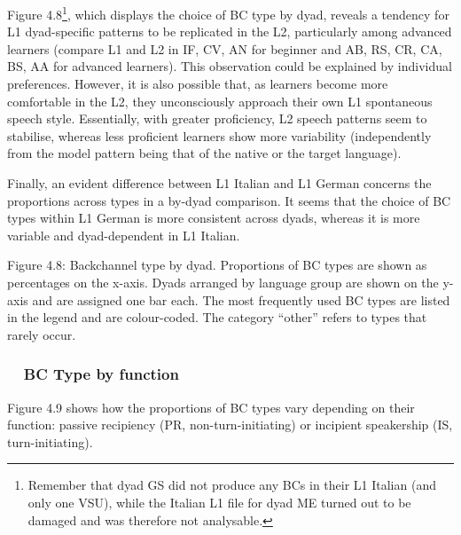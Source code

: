 \begin{styleStandard}
Figure 4.8\footnote{Remember that dyad GS did not produce any BCs in their L1 Italian (and only one VSU), while the Italian L1 file for dyad ME turned out to be damaged and was therefore not analysable.\par }, which displays the choice of BC type by dyad, reveals a tendency for L1 dyad-specific patterns to be replicated in the L2, particularly among advanced learners (compare L1 and L2 in IF, CV, AN for beginner and AB, RS, CR, CA, BS, AA for advanced learners). This observation could be explained by individual preferences. However, it is also possible that, as learners become more comfortable in the L2, they unconsciously approach their own L1 spontaneous speech style. Essentially, with greater proficiency, L2 speech patterns seem to stabilise, whereas less proficient learners show more variability (independently from the model pattern being that of the native or the target language).
\end{styleStandard}

\begin{styleStandard}
Finally, an evident difference between L1 Italian and L1 German concerns the proportions across types in a by-dyad comparison. It seems that the choice of BC types within L1 German is more consistent across dyads, whereas it is more variable and dyad-dependent in L1 Italian.
\end{styleStandard}

\begin{stylecaption}
  [Warning: Image ignored] %
 
\end{stylecaption}

\begin{stylecaption}
Figure 4.8: Backchannel type by dyad. Proportions of BC types are shown as percentages on the x-axis. Dyads arranged by language group are shown on the y-axis and are assigned one bar each. The most frequently used BC types are listed in the legend and are colour-coded. The category “other” refers to types that rarely occur.
\end{stylecaption}

\subsubsection[\ \ BC Type by function]{\ \ BC Type by function}
\hypertarget{Toc191305955}{}\begin{styleStandard}
Figure 4.9 shows how the proportions of BC types vary depending on their function: passive recipiency (PR, non-turn-initiating) or incipient speakership (IS, turn-initiating).
\end{styleStandard}

